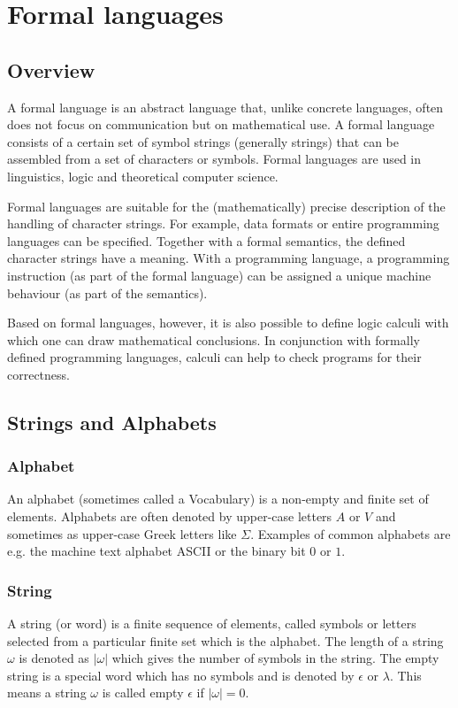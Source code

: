 \chapter{Formal languages}
\section{Overview}
A formal language is an abstract language that, unlike concrete languages, often does not focus on communication but on mathematical use. A formal language consists of a certain set of symbol strings (generally strings) that can be assembled from a set of characters or symbols. Formal languages are used in linguistics, logic and theoretical computer science.

Formal languages are suitable for the (mathematically) precise description of the handling of character strings. For example, data formats or entire programming languages can be specified. Together with a formal semantics, the defined character strings have a meaning. With a programming language, a programming instruction (as part of the formal language) can be assigned a unique machine behaviour (as part of the semantics).

Based on formal languages, however, it is also possible to define logic calculi with which one can draw mathematical conclusions. In conjunction with formally defined programming languages, calculi can help to check programs for their correctness.
\section{Strings and Alphabets}
\subsection{Alphabet}
An alphabet (sometimes called a Vocabulary) is a non-empty and finite set of elements. Alphabets are often denoted by upper-case letters $A$ or $V$ and sometimes as upper-case Greek letters like $\Sigma$. Examples of common alphabets are e.g. the machine text alphabet ASCII or the binary bit $0$ or $1$.
\subsection{String}
A string (or word) is a finite sequence of elements, called symbols or letters selected from a particular finite set which is the alphabet.
The length of a string $\omega$ is denoted as $|\omega|$ which gives the number of symbols in the string. The empty string is a special word which has no symbols and is denoted by $\epsilon$ or $\lambda$. This means a string $\omega$ is called empty $\epsilon$ if $|\omega|=0$.
